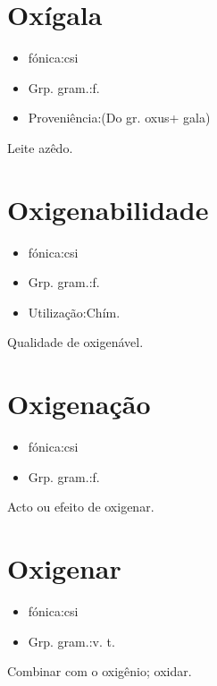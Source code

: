 \section{Oxígala}
\begin{itemize}
\item {fónica:csi}
\end{itemize}
\begin{itemize}
\item {Grp. gram.:f.}
\end{itemize}
\begin{itemize}
\item {Proveniência:(Do gr. \textunderscore oxus\textunderscore  + \textunderscore gala\textunderscore )}
\end{itemize}
Leite azêdo.
\section{Oxigenabilidade}
\begin{itemize}
\item {fónica:csi}
\end{itemize}
\begin{itemize}
\item {Grp. gram.:f.}
\end{itemize}
\begin{itemize}
\item {Utilização:Chím.}
\end{itemize}
Qualidade de oxigenável.
\section{Oxigenação}
\begin{itemize}
\item {fónica:csi}
\end{itemize}
\begin{itemize}
\item {Grp. gram.:f.}
\end{itemize}
Acto ou efeito de oxigenar.
\section{Oxigenar}
\begin{itemize}
\item {fónica:csi}
\end{itemize}
\begin{itemize}
\item {Grp. gram.:v. t.}
\end{itemize}
Combinar com o oxigênio; oxidar.
